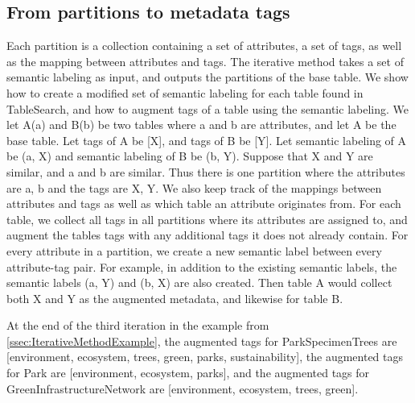 \subsection{From partitions to metadata tags}
\label{ssec:FromPartitionsToMetadataTags}

Each partition is a collection containing a set of attributes, a set of tags, as well as the mapping between attributes and tags. The iterative method takes a set of semantic labeling as input, and outputs the partitions of the base table. We show how to create a modified set of semantic labeling for each table found in TableSearch, and how to augment tags of a table using the semantic labeling. We let A(a) and B(b) be two tables where a and b are attributes, and let A be the base table. Let tags of A be [X], and tags of B be [Y]. Let semantic labeling of A be {(a, X)} and semantic labeling of B be {(b, Y)}. Suppose that X and Y are similar, and a and b are similar. Thus there is one partition where the attributes are {a, b} and the tags are {X, Y}. We also keep track of the mappings between attributes and tags as well as which table an attribute originates from. For each table, we collect all tags in all partitions where its attributes are assigned to, and augment the tables tags with any additional tags it does not already contain. For every attribute in a partition, we create a new semantic label between every attribute-tag pair. For example, in addition to the existing semantic labels, the semantic labels (a, Y) and (b, X) are also created. Then table A would collect both X and Y as the augmented metadata, and likewise for table B.

At the end of the third iteration in the example from \autoref{ssec:IterativeMethodExample}, the augmented tags for ParkSpecimenTrees are [environment, ecosystem, trees, green, parks, sustainability], the augmented tags for Park are [environment, ecosystem, parks], and the augmented tags for GreenInfrastructureNetwork are [environment, ecosystem, trees, green].

